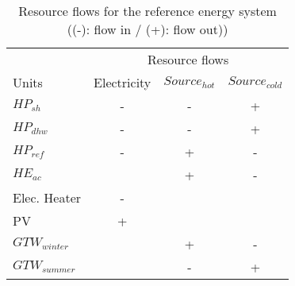 \begin{table}[h!]
	\centering
	\caption{Resource flows for the reference energy system ((-): flow in / (+): flow out))}\vspace{2mm}
	\label{tab:layers_ref} 
	\begin{tabular}{lccc}
		\toprule
		& \multicolumn{3}{c}{Resource flows}             \\
		Units          & Electricity & $Source_{hot}$ & $Source_{cold}$ \\ \midrule
		$HP_{sh}$      & -           & -              & +               \\
		$HP_{dhw}$     & -           & -              & +               \\
		$HP_{ref}$     & -           & +              & -               \\
		$HE_{ac}$      &             & +              & -               \\
		Elec. Heater   & -           &                &                 \\
		PV             & +           &                &                 \\
		$GTW_{winter}$ &             & +              & -               \\
		$GTW_{summer}$ &             & -              & +              \\ \bottomrule
	\end{tabular}
\end{table}

